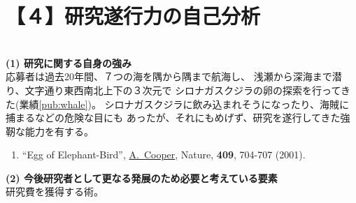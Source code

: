 
\section{【４】研究遂行力の自己分析}

\SelfReviewInstructions\\%
\noindent
\textbf{(1) 研究に関する自身の強み}\\
	応募者は過去20年間、７つの海を隅から隅まで航海し、
	浅瀬から深海まで潜り、文字通り東西南北上下の３次元で
	シロナガスクジラの卵の探索を行ってきた(業績\ref{pub:whale})。
	シロナガスクジラに飲み込まれそうになったり、海賊に捕まるなどの危険な目にも
	あったが、それにもめげず、研究を遂行してきた強靭な能力を有する。
	\begin{enumerate}
			\label{pub:whale}
				
			\label{pub:theoegg}
				
		

			{JofUR\\({\tt www.universalrejection.org})}{{\bf N/A}}{2002}
		
		\item ``Egg of Elephant-Bird'', 
				\underline{A.~Cooper},
				Nature, {\bf 409}, 704-707 (2001).	%
	\end{enumerate}

\vspace{5mm}
\noindent
\textbf{(2) 今後研究者として更なる発展のため必要と考えている要素}\\
研究費を獲得する術。



